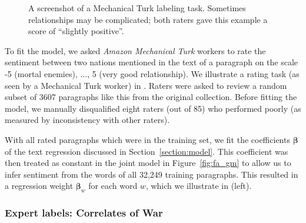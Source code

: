 \begin{figure}
  \setlength\fboxsep{0pt}
  \setlength\fboxrule{0.5pt}
  \center {}
  \label{fig:mechanical_turk_sample}
  \small\caption{A screenshot of a Mechanical Turk labeling task.
    Sometimes relationships may be complicated; both raters gave this
    example a score of ``slightly positive''.}
  \normalsize
\end{figure}

To fit the model, we asked \emph{Amazon Mechanical Turk} workers to
rate the sentiment between two nations mentioned in the text of a
paragraph on the scale -5 (mortal enemies), $\ldots$, 5 (very good
relationship). We illustrate a rating task (as seen by a Mechanical
Turk worker) in . Raters were asked to
review a random subset of 3607 paragraphs like this from the original
collection.  Before fitting the model, we manually disqualified eight
raters (out of 85) who performed poorly (as measured
by inconsistency with other raters).

With all rated paragraphs which were in the training set, we fit the
coefficients $\bm \beta$ of the text regression discussed in
Section~\ref{section:model}.  This coefficient was then treated as
constant in the joint model in Figure~\ref{fig:fa_gm} to allow us to
infer sentiment from the words of all 32,249 training paragraphs.
This resulted in a regression weight $\bm \beta_w$ for each word $w$,
which we illustrate in  (left).

\subsubsection{Expert labels: Correlates of War}
\label{section:correlates_of_war}

